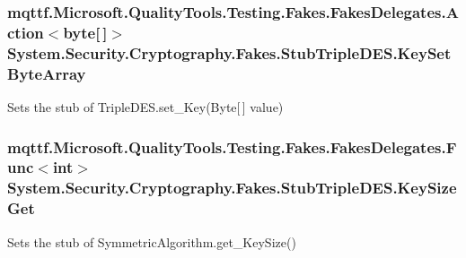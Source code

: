 \hypertarget{class_system_1_1_security_1_1_cryptography_1_1_fakes_1_1_stub_triple_d_e_s_a1a2ba1458fef8fcfb635ebb300796860}{
\subsubsection[{Key\-Set\-Byte\-Array}]{\setlength{\rightskip}{0pt plus 5cm}mqttf.\-Microsoft.\-Quality\-Tools.\-Testing.\-Fakes.\-Fakes\-Delegates.\-Action$<$byte\mbox{[}$\,$\mbox{]}$>$ System.\-Security.\-Cryptography.\-Fakes.\-Stub\-Triple\-D\-E\-S.\-Key\-Set\-Byte\-Array}}\label{class_system_1_1_security_1_1_cryptography_1_1_fakes_1_1_stub_triple_d_e_s_a1a2ba1458fef8fcfb635ebb300796860}


Sets the stub of Triple\-D\-E\-S.\-set\-\_\-\-Key(\-Byte\mbox{[}$\,$\mbox{]} value)

\hypertarget{class_system_1_1_security_1_1_cryptography_1_1_fakes_1_1_stub_triple_d_e_s_ab2a139be4e5a788bc3b48a5b224fed9f}{
\subsubsection[{Key\-Size\-Get}]{\setlength{\rightskip}{0pt plus 5cm}mqttf.\-Microsoft.\-Quality\-Tools.\-Testing.\-Fakes.\-Fakes\-Delegates.\-Func$<$int$>$ System.\-Security.\-Cryptography.\-Fakes.\-Stub\-Triple\-D\-E\-S.\-Key\-Size\-Get}}\label{class_system_1_1_security_1_1_cryptography_1_1_fakes_1_1_stub_triple_d_e_s_ab2a139be4e5a788bc3b48a5b224fed9f}


Sets the stub of Symmetric\-Algorithm.\-get\-\_\-\-Key\-Size()

